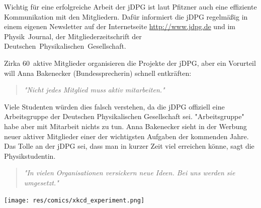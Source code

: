 \begin{multicols}{2}
Wichtig für eine erfolgreiche Arbeit der jDPG ist laut Pfitzner auch eine effiziente Kommunikation mit den Mitgliedern. Dafür informiert die jDPG regelmäßig in einem eigenen Newsletter auf der Internetseite \url{http://www.jdpg.de} und im Physik~Journal, der Mitgliederzeitschrift der Deutschen~Physikalischen~Gesellschaft.

Zirka 60~aktive Mitglieder organisieren die Projekte der jDPG, aber ein Vorurteil will Anna Bakenecker (Bundessprecherin) schnell entkräften:
\begin{quote}
\textit{"Nicht jedes Mitglied muss aktiv mitarbeiten."}
\end{quote}
Viele Studenten würden dies falsch verstehen, da die jDPG offiziell eine Arbeitsgruppe der Deutschen Physikalischen Gesellschaft sei. "Arbeitsgruppe" habe aber mit Mitarbeit nichts zu tun. Anna Bakenecker sieht in der Werbung neuer aktiver Mitglieder einer der wichtigsten Aufgaben der kommenden Jahre. Das Tolle an der jDPG sei, dass man in kurzer Zeit viel erreichen könne, sagt die Physikstudentin.
\begin{quote}
\textit{"In vielen Organisationen versickern neue Ideen. Bei uns werden sie umgesetzt."}
\end{quote}


\end{multicols}

\begin{center}
\texttt{[image: res/comics/xkcd\_experiment.png]}
\end{center}
